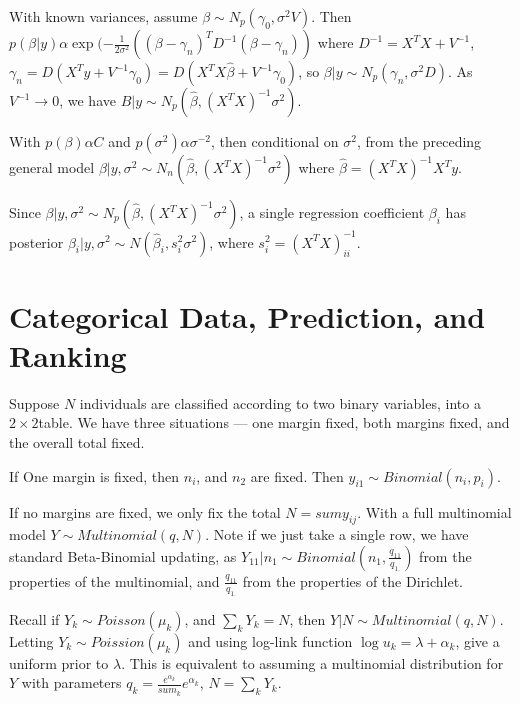 With known variances, assume $\beta \sim N_{p}(\gamma_{0}, \sigma^{2}
V)$.  Then $p(\beta | y) \alpha \exp(-\frac{1}{2 \sigma^{2}} ((\beta -
\gamma_{n})^{T} D^{-1} (\beta - \gamma_{n}))$ where $D^{-1} = X^{T} X
+ V^{-1}$, $\gamma_{n} = D(X^{T} y + V^{-1} \gamma_{0}) = D(X^{T} X
\hat \beta + V^{-1} \gamma_{0})$, so $\beta | y \sim N_{p}(\gamma_{n},
\sigma^{2} D)$.  As $V^{-1} \rightarrow 0$, we have $B|y \sim
N_{p}(\hat \beta, (X^{T} X)^{-1} \sigma^{2})$.

With $p(\beta) \alpha C$ and $p(\sigma^{2}) \alpha \sigma^{-2}$, then
conditional on $\sigma^{2}$, from the preceding general model $\beta |
y, \sigma^{2} \sim N_{n}(\hat \beta, (X^{T} X)^{-1} \sigma^{2})$ where
$\hat \beta = (X^{T} X)^{-1} X^{T} y$.

Since $\beta | y, \sigma^{2} \sim N_{p}(\hat \beta, (X^{T} X)^{-1}
\sigma^{2})$, a single regression coefficient $\beta_{i}$ has
posterior $\beta_{i} | y, \sigma^{2} \sim N(\hat \beta_{i}, s_{i}^{2}
\sigma^{2})$, where $s_{i}^{2} = (X^{T} X)^{-1}_{ii}$.


\section{Categorical Data, Prediction, and Ranking}
\label{sec:categ-data-pred}

Suppose $N$ individuals are classified according to two binary
variables, into a $2 \times 2$table.  We have three situations --- one
margin fixed, both margins fixed, and the overall total fixed.

If One
margin is fixed, then $n_{i}$, and $n_{2}$ are fixed.  Then $y_{i1}
\sim Binomial(n_{i}, p_{i})$.

If no margins are fixed, we only fix the total $N = sum y_{ij}$. With
a full multinomial model $Y \sim Multinomial(q, N)$. Note if we just
take a single row, we have standard Beta-Binomial updating, as $Y_{11}
| n_{1} \sim Binomial(n_{1}, \frac{q_{11}}{q_{1.}} )$ from the
properties of the multinomial, and $\frac{q_{11}}{q_{1.}}$ from the
properties of the Dirichlet.

\begin{defn}
  \label{sec:categ-data-pred-1}
  Recall if $Y_{k} \sim Poisson(\mu_{k})$, and $\sum_{k}^{} Y_{k} =
  N$, then $Y|N \sim Multinomial(q, N)$.  Letting $Y_{k} \sim
  Poission(\mu_{k})$ and using log-link function $\log u_{k} = \lambda
  + \alpha_{k}$, give a uniform prior to $\lambda$.  This is
  equivalent to assuming a multinomial distribution for $Y$ with
  parameters $q_{k} = \frac{e^{\alpha_{k}}}{sum_{k}} e^{\alpha_{k}}$,
  $N = \sum_{k}^{} Y_{k}$.
\end{defn}


